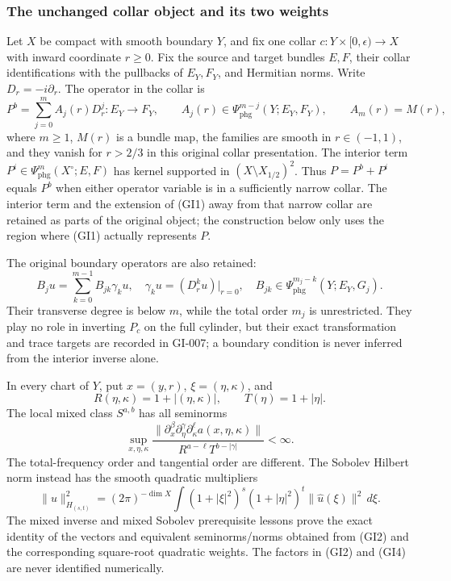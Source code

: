 \documentclass[
  11pt,
]{article}
\begin{document}
\subsubsection{The unchanged collar object and its two
weights}\label{the-unchanged-collar-object-and-its-two-weights}

Let \(X\) be compact with smooth boundary \(Y\), and fix one collar
\(c:Y\times[0,\epsilon)\to X\) with inward coordinate \(r\geq0\). Fix
the source and target bundles \(E,F\), their collar identifications with
the pullbacks of \(E_Y,F_Y\), and Hermitian norms. Write
\(D_r=-i\partial_r\). The operator in the collar is \[
 P^b=\sum_{j=0}^{m}A_j(r)D_r^j:E_Y\longrightarrow F_Y,
 \qquad A_j(r)\in\Psi_{\mathrm{phg}}^{m-j}(Y;E_Y,F_Y),
 \qquad A_m(r)=M(r),
 \tag{GI1}
\] where \(m\geq1\), \(M(r)\) is a bundle map, the families are smooth
in \(r\in(-1,1)\), and they vanish for \(r>2/3\) in this original collar
presentation. The interior term
\(P^i\in\Psi_{\mathrm{phg}}^m(X^\circ;E,F)\) has kernel supported in
\((X\setminus X_{1/2})^2\). Thus \(P=P^b+P^i\) equals \(P^b\) when
either operator variable is in a sufficiently narrow collar. The
interior term and the extension of (GI1) away from that narrow collar
are retained as parts of the original object; the construction below
only uses the region where (GI1) actually represents \(P\).

The original boundary operators are also retained: \[
 B_j u=\sum_{k=0}^{m-1}B_{jk}\gamma_k u,
 \quad \gamma_k u=(D_r^ku)|_{r=0},
 \quad B_{jk}\in\Psi_{\mathrm{phg}}^{m_j-k}(Y;E_Y,G_j).
 \tag{GI1a}
\] Their transverse degree is below \(m\), while the total order \(m_j\)
is unrestricted. They play no role in inverting \(P_c\) on the full
cylinder, but their exact transformation and trace targets are recorded
in GI-007; a boundary condition is never inferred from the interior
inverse alone.

In every chart of \(Y\), put \(x=(y,r)\), \(\xi=(\eta,\kappa)\), and \[
 R(\eta,\kappa)=1+|(\eta,\kappa)|,\qquad
 T(\eta)=1+|\eta|.
 \tag{GI2}
\] The local mixed class \(S^{a,b}\) has all seminorms \[
 \sup_{x,\eta,\kappa}
 \frac{\|\partial_x^\beta\partial_\eta^\gamma\partial_\kappa^\ell a(x,\eta,\kappa)\|}
 {R^{a-\ell}T^{b-|\gamma|}}<\infty.
 \tag{GI3}
\] The total-frequency order and tangential order are different. The
Sobolev Hilbert norm instead has the smooth quadratic multipliers \[
 \|u\|_{H_{(s,t)}}^2=(2\pi)^{-\dim X}\int
 (1+|\xi|^2)^s(1+|\eta|^2)^t\|\widehat u(\xi)\|^2\,d\xi.
 \tag{GI4}
\] The mixed inverse and mixed Sobolev prerequisite lessons prove the
exact identity of the vectors and equivalent seminorms/norms obtained
from (GI2) and the corresponding square-root quadratic weights. The
factors in (GI2) and (GI4) are never identified numerically.
\end{document}
